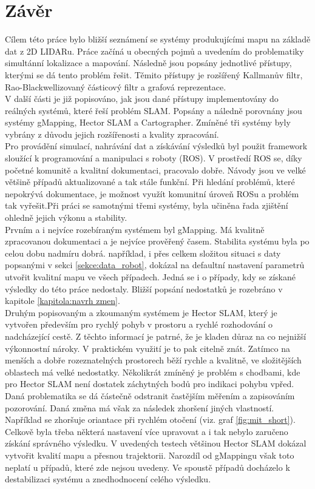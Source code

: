 \documentclass[12pt]{report}
\begin{document}
\chapter{Závěr}
Cílem této práce bylo bližší seznámení se systémy produkujícími mapu na základě dat z 2D LIDARu. Práce začíná u obecných pojmů a uvedením do problematiky simultánní lokalizace a mapování. Následně jsou popsány jednotlivé přístupy, kterými se dá tento problém řešit. Těmito přístupy je rozšířený Kallmanův filtr, Rao-Blackwellizovaný částicový filtr a grafová reprezentace.\\
\indent V další části je již popisováno, jak jsou dané přístupy implementovány do reálných systémů, které řeší problém SLAM. Popsány a náledně porovnány jsou systémy gMapping, Hector SLAM a Cartographer. Zmíněné tři systémy byly vybrány z důvodu jejich rozšířenosti a kvality zpracování.\\
\indent Pro provádění simulací, nahrávání dat a získávání výsledků byl použit framework sloužící k programování a manipulaci s roboty (ROS). V prostředí ROS se, díky početné komunitě a kvalitní dokumentaci, pracovalo dobře. Návody jsou ve velké většině případů aktualizované a tak stále funkční. Při hledání problémů, které nepokrývá dokumentace, je možnost využít komunitní úroveň ROSu a problém tak vyřešit.Při práci se samotnými třemi systémy, byla učiněna řada zjištění ohledně jejich výkonu a stability. \\
\indent Prvním a i nejvíce rozebíraným systémem byl gMapping. Má kvalitně zpracovanou dokumentaci a je nejvíce prověřený časem. Stabilita systému byla po celou dobu nadmíru dobrá. například, i přes celkem složitou situaci s daty popsanými v sekci \ref{sekce:data_robot}, dokázal na defaultní nastavení parametrů utvořit kvalitní mapu ve všech případech. Jedná se i o případy, kdy se získané výsledky do této práce nedostaly. Bližší popsání nedostatků je rozebráno v kapitole \ref{kapitola:navrh zmen}.\\
\indent Druhým popisovaným a zkoumaným systémem je Hector SLAM, který je vytvořen především pro rychlý pohyb v prostoru a rychlé rozhodování o nadcházející cestě. Z těchto informací je patrné, že je kladen důraz na co nejnižší výkonnostní nároky. V praktickém využití je to pak citelně znát. Zatímco na menších a dobře rozeznatelných prostorech běží rychle a kvalitně, ve složitějších oblastech má velké nedostatky. Několikrát zmíněný je problém s chodbami, kde pro Hector SLAM není dostatek záchytných bodů pro indikaci pohybu vpřed. Daná problematika se dá částečně odstranit častějším měřením a zapisováním pozorování. Daná změna má však za následek zhoršení jiných vlastností. Například se zhoršuje oriantace při rychlém otočení (viz. graf \ref{fig:mit_short}). Celkově byla třeba některá nastavení více upravovat a i tak nebylo zaručeno získání správného výsledku. V uvedených testech většinou Hector SLAM dokázal vytvořit kvalití mapu a přesnou trajektorii. Narozdíl od gMappingu však toto neplatí u případů, které zde nejsou uvedeny. Ve spoustě případů docházelo k destabilizaci systému a znedhodnocení celého výsledku.\\
\end{document}
